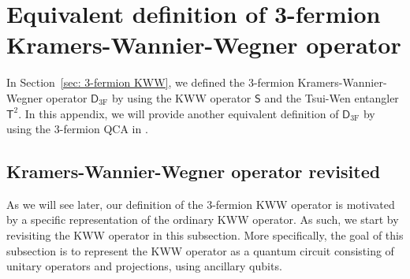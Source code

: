 \documentclass[aps,twocolumn,prx,floatfix,preprintnumbers, nofootinbib,10pt]{revtex4-2}
\numberwithin{equation}{section}
\theoremstyle{definition}
\theoremstyle{remark}
\theoremstyle{claim}
\begin{document}
\section{Equivalent definition of 3-fermion Kramers-Wannier-Wegner operator}
\label{sec: Equivalent definition of 3-fermion KWW operator}
In Section~\ref{sec: 3-fermion KWW}, we defined the 3-fermion Kramers-Wannier-Wegner operator $\mathsf{D}_\text{3F}$ by using the KWW operator $\mathsf{S}$ and the Tsui-Wen entangler $\mathsf{T}^2$.
In this appendix, we will provide another equivalent definition of $\mathsf{D}_\text{3F}$ by using the 3-fermion QCA in \cite[Appendix E]{Shirley_2022}.

\subsection{Kramers-Wannier-Wegner operator revisited}
\label{sec: KWW revisited}
As we will see later, our definition of the 3-fermion KWW operator is motivated by a specific representation of the ordinary KWW operator.
As such, we start by revisiting the KWW operator in this subsection.
More specifically, the goal of this subsection is to represent the KWW operator as a quantum circuit consisting of unitary operators and projections, using ancillary qubits.

\end{document}

